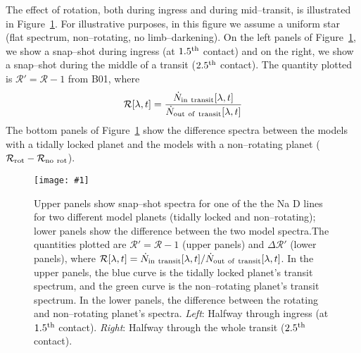 \documentclass[12pt,preprint]{aastex}
\def\plotone#1{\centering \leavevmode
\texttt{[image: \#1]}}
\begin{document}
The effect of rotation, both during ingress and during mid--transit,
is illustrated in Figure~\ref{fig:spec. and diff.}.
For illustrative purposes, in this figure we assume a uniform star (flat
spectrum, non--rotating, no limb--darkening).  On the left panels of
Figure~\ref{fig:spec. and diff.}, we show a snap--shot during ingress
(at $1.5^{\rm th}$ contact) and on the right, we show a snap--shot during the
middle of a transit ($2.5^{\rm th}$ contact).  The quantity plotted is
$\mathcal{R}' = \mathcal{R}-1$ from B01, where
\begin{equation}
\mathcal{R}[\lambda,t] = \frac{\dot{N}_{\rm in~transit}[\lambda,t]}{\dot{N}_{\rm out~of~transit}[\lambda,t]}
\label{eq:Brown R}
\end{equation}
The bottom panels of Figure~\ref{fig:spec. and diff.} show the
difference spectra between the models with a tidally locked planet and the
models with a non--rotating planet ($\mathcal{R}_{\rm rot} - \mathcal{R}_{\rm no~rot}$).
\begin{figure}[h!]
\plotone
{fig2.eps}
\caption{Upper panels show snap--shot spectra for one of the the Na D lines
for two different model planets (tidally locked and non--rotating); lower
panels show the difference between the two model spectra.The quantities
plotted are $\mathcal{R}' = \mathcal{R}-1$ (upper panels) and
$\Delta \mathcal{R}'$ (lower panels), where
$\mathcal{R}[\lambda,t] = \dot{N}_{\rm in~transit}[\lambda,t]/\dot{N}_{\rm out~of~transit}[\lambda,t]$.
In the upper panels, the blue curve is the tidally locked planet's transit
spectrum, and the green curve is the non--rotating planet's transit spectrum.
In the lower panels, the difference between the rotating and non--rotating
planet's spectra.
{\it Left}: Halfway through ingress (at $1.5^{\rm th}$ contact).
{\it Right}: Halfway through the whole transit ($2.5^{\rm th}$ contact).}
\label{fig:spec. and diff.}
\end{figure}
\end{document}
